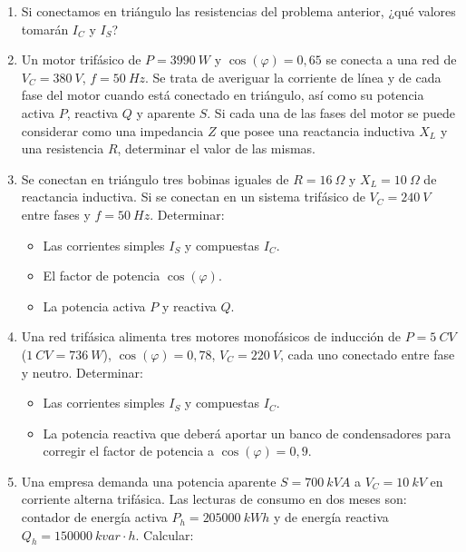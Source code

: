 \documentclass[../main]{subfiles}
\begin{document}
\begin{enumerate}
    resistencias con $R=\qty{10}{\Omega}$ conectadas en estrella.
    Determinar la potencia que consumirán cuando se aplique
    $V_C=\qty{230}{V}$ entre fases, así como la corriente simple $I_S$
    y compuesta $I_C$.
  \item Si conectamos en triángulo las resistencias del problema
    anterior, ¿qué valores tomarán $I_C$ y $I_S$?
  \item Un motor trifásico de $P=\qty{3990}{W}$ y
    $\cos(\varphi)=0{,}65$ se conecta a una red de
    $V_C=\qty{380}{V}$, $f=\qty{50}{Hz}$. Se trata de averiguar la
    corriente de línea y de cada fase del motor cuando está conectado
    en triángulo, así como su potencia activa $P$, reactiva $Q$ y
    aparente $S$. Si cada una de las fases del motor se puede
    considerar como una impedancia $Z$ que posee una reactancia
    inductiva $X_L$ y una resistencia $R$, determinar el valor de las
    mismas.
  \item Se conectan en triángulo tres bobinas iguales de
    $R=\qty{16}{\Omega}$ y $X_L=\qty{10}{\Omega}$ de reactancia
    inductiva. Si se conectan en un sistema trifásico de
    $V_C=\qty{240}{V}$ entre fases y $f=\qty{50}{Hz}$. Determinar:
    \begin{itemize}
      \item Las corrientes simples $I_S$ y compuestas $I_C$.
      \item El factor de potencia $\cos(\varphi)$.
      \item La potencia activa $P$ y reactiva $Q$.
    \end{itemize}
  \item Una red trifásica alimenta tres motores monofásicos de
    inducción de $P=\qty{5}{CV}$ ($\qty{1}{CV}=\qty{736}{W}$),
    $\cos(\varphi)=0{,}78$, $V_C=\qty{220}{V}$, cada uno conectado
    entre fase y neutro. Determinar:
    \begin{itemize}
      \item Las corrientes simples $I_S$ y compuestas $I_C$.
      \item La potencia reactiva que deberá aportar un banco de
        condensadores para corregir el factor de potencia a
        $\cos(\varphi)=0{,}9$.
    \end{itemize}
  \item Una empresa demanda una potencia aparente $S=\qty{700}{kVA}$
    a $V_C=\qty{10}{kV}$ en corriente alterna trifásica. Las lecturas
    de consumo en dos meses son: contador de energía activa
    $P_h=\qty{205000}{kWh}$ y de energía reactiva
    $Q_h=\qty{150000}{kvar\cdot h}$. Calcular:

\end{enumerate}
\end{document}

